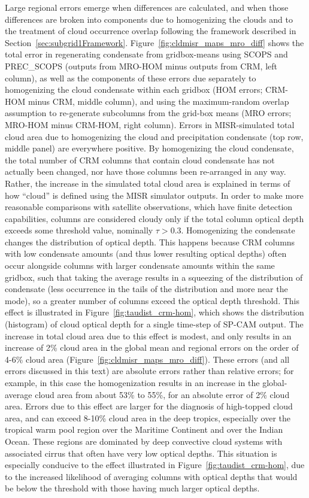 Large regional errors emerge when differences are calculated, and when
those differences are broken into components due to homogenizing the
clouds and to the treatment of cloud occurrence overlap following the
framework described in Section~\ref{sec:subgrid1Framework}.
Figure~\ref{fig:cldmisr_maps_mro_diff} shows the total error in
regenerating condensate from gridbox-means using SCOPS and PREC\_SCOPS
(outputs from MRO-HOM minus outputs from CRM, left column), as well as
the components of these errors due separately to homogenizing the cloud
condensate within each gridbox (HOM errors; CRM-HOM minus CRM, middle
column), and using the maximum-random overlap assumption to re-generate
subcolumns from the grid-box means (MRO errors; MRO-HOM minus CRM-HOM,
right column). Errors in MISR-simulated total cloud area due to
homogenizing the cloud and precipitation condensate (top row, middle
panel) are everywhere positive. By homogenizing the cloud condensate,
the total number of CRM columns that contain cloud condensate has not
actually been changed, nor have those columns been re-arranged in any
way. Rather, the increase in the simulated total cloud area is explained
in terms of how ``cloud'' is defined using the MISR simulator outputs.
In order to make more reasonable comparisons with satellite
observations, which have finite detection capabilities, columns are
considered cloudy only if the total column optical depth exceeds some
threshold value, nominally \(\tau > 0.3\). Homogenizing the condensate
changes the distribution of optical depth. This happens because CRM
columns with low condensate amounts (and thus lower resulting optical
depths) often occur alongside columns with larger condensate amounts
within the same gridbox, such that taking the average results in a
squeezing of the distribution of condensate (less occurrence in the
tails of the distribution and more near the mode), so a greater number
of columns exceed the optical depth threshold. This effect is
illustrated in Figure~\ref{fig:taudist_crm-hom}, which shows the
distribution (histogram) of cloud optical depth for a single time-step
of SP-CAM output. The increase in total cloud area due to this effect is
modest, and only results in an increase of 2\% cloud area in the global
mean and regional errors on the order of 4-6\% cloud area
(Figure~\ref{fig:cldmisr_maps_mro_diff}). These errors (and all errors
discussed in this text) are absolute errors rather than relative errors;
for example, in this case the homogenization results in an increase in
the global-average cloud area from about 53\% to 55\%, for an absolute
error of 2\% cloud area. Errors due to this effect are larger for the
diagnosis of high-topped cloud area, and can exceed 8-10\% cloud area in
the deep tropics, especially over the tropical warm pool region over the
Maritime Continent and over the Indian Ocean. These regions are
dominated by deep convective cloud systems with associated cirrus that
often have very low optical depths. This situation is especially
conducive to the effect illustrated in Figure~\ref{fig:taudist_crm-hom},
due to the increased likelihood of averaging columns with optical depths
that would be below the threshold with those having much larger optical
depths.

